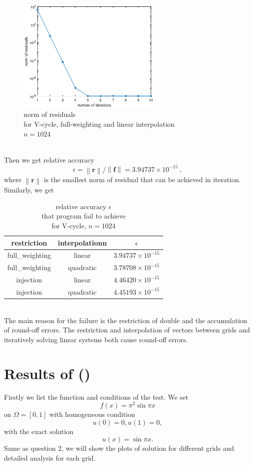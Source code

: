 \documentclass[a4paper,twocolumn]{article}
\theoremstyle{definition}
\begin{document}
\begin{figure}[!htp]   
	\centering
	\includegraphics[width=7cm]{Pictures/F3_1.eps}
	\caption{norm of residuals \\for V-cycle, full-weighting and linear interpolation\\ $n = 1024$}
\end{figure}\\
Then we get relative accuracy 
$$
\epsilon = \left \| \textbf{r} \right \| / \left \| \textbf{f} \right \| = 3.94737\times10^{-15} \ ,
$$ 
where $\left \| \textbf{r} \right \| $ is the smallest norm of residual that can be achieved in iteration. \\
\newpage
\noindent Similarly, we get
\begin{table}[!htp]
	\centering
	\begin{tabular}{|c|c|c|}
		\hline	
		restriction&interpolationn  & $\epsilon$ \\
		\hline		
		full\_weighting&linear & $3.94737\times10^{-15}$ \\
		\hline		
		full\_weighting&quadratic & $3.78708\times 10^{-15}$ \\
		\hline		
		injection &linear& $4.46420\times 10^{-15}$ \\
		\hline		
		injection&quadratic & $4.45193\times 10^{-15}$ \\
		\hline
	\end{tabular}
	\caption{relative accuracy $\epsilon$ \\that program fail to achieve\\for V-cycle, $n = 1024$}
\end{table}\\
The main reason for the failure is the restriction of double and the accumulation of round-off errors. The restriction and interpolation of vectors between grids and iteratively solving linear systems both cause round-off errors.
\section{Results of (\uppercase\expandafter{})}
Firstly we list the function and conditions of the test.
We set 
$$
f(x) = \pi^2\sin \pi x 
$$
on $\Omega = [0,1]$ with homogeneous condition
$$
u(0) = 0,u(1) = 0 ,
$$
with the exact solution
$$
u(x) = \sin \pi x .
$$ 
Same as question 2, we will show the plots of solution for different grids and detailed analysis for each grid.
\end{document}
